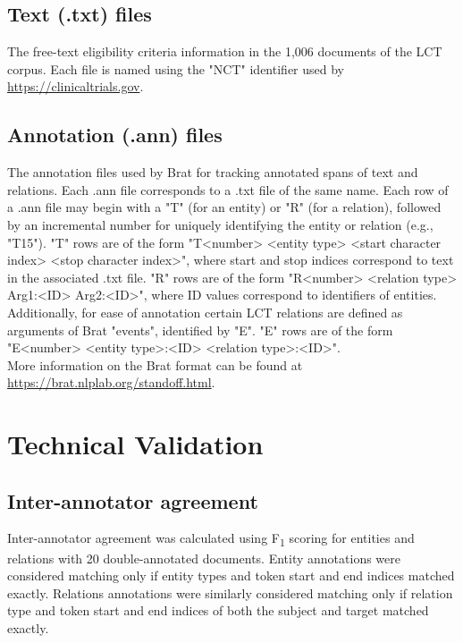 \documentclass[fleqn,10pt]{wlscirep}
\begin{document}
\subsection*{Text (.txt) files}
The free-text eligibility criteria information in the 1,006 documents of the LCT corpus. Each file is named using the "NCT" identifier used by \url{https://clinicaltrials.gov}. \\

\subsection*{Annotation (.ann) files}
The annotation files used by Brat for tracking annotated spans of text and relations. Each .ann file corresponds to a .txt file of the same name. Each row of a .ann file may begin with a "T" (for an entity) or "R" (for a relation), followed by an incremental number for uniquely identifying the entity or relation (e.g., "T15"). "T" rows are of the form "T<number> <entity type> <start character index> <stop character index>", where start and stop indices correspond to text in the associated .txt file. "R" rows are of the form "R<number> <relation type> Arg1:<ID> Arg2:<ID>", where ID values correspond to identifiers of entities. Additionally, for ease of annotation certain LCT relations are defined as arguments of Brat "events", identified by "E". "E" rows are of the form "E<number> <entity type>:<ID> <relation type>:<ID>". \\

\noindent More information on the Brat format can be found at \url{https://brat.nlplab.org/standoff.html}. \\

\section*{Technical Validation}
\label{sec:technical_validation}
\subsection*{Inter-annotator agreement}
\noindent Inter-annotator agreement was calculated using F\textsubscript{1} scoring for entities and relations with 20 double-annotated documents. Entity annotations were considered matching only if entity types and token start and end indices matched exactly. Relations annotations were similarly considered matching only if relation type and token start and end indices of both the subject and target matched exactly. \\
\end{document}
